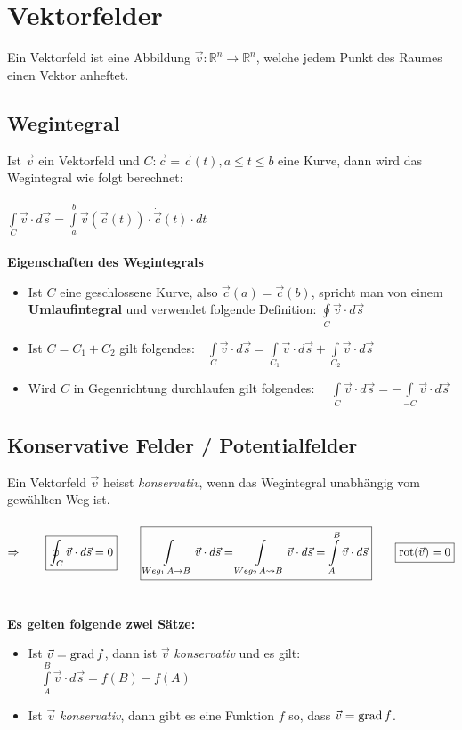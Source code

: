 \section{Vektorfelder}
Ein Vektorfeld ist eine Abbildung $\vec{v}:\mathbb{R}^n\rightarrow
\mathbb{R}^n$, welche jedem Punkt des Raumes einen Vektor anheftet.
\subsection{Wegintegral}
Ist $\vec{v}$ ein Vektorfeld und $C:\vec{c}=\vec{c}(t),a\leq t \leq b$ eine
Kurve, dann wird das Wegintegral wie folgt berechnet:\\\\
$\boxed{\int\limits_C\vec{v}\cdot d\vec{s}=
\int\limits_a^b\vec{v}(\vec{c}(t))\cdot \dot{\vec{c}}(t)\cdot dt}$\\\\

\textbf{Eigenschaften des Wegintegrals}
\begin{itemize}
  \item Ist $C$ eine geschlossene Kurve, also $\vec{c}(a)=\vec{c}(b)$, spricht
  man von einem \textbf{Umlaufintegral} und verwendet folgende Definition:
  $\oint\limits_C \vec{v}\cdot d\vec{s}$
  \item Ist $C=C_1+C_2$ gilt folgendes:$\quad\int\limits_C \vec{v}\cdot
  d\vec{s}=\int\limits_{C_1} \vec{v}\cdot d\vec{s}+\int\limits_{C_2}
  \vec{v}\cdot d\vec{s}$
  \item Wird $C$ in Gegenrichtung durchlaufen gilt folgendes:
  $\quad\int\limits_C \vec{v}\cdot
  d\vec{s}=-\int\limits_{-C} \vec{v}\cdot d\vec{s}$
\end{itemize}

\subsection{Konservative Felder / Potentialfelder}
Ein Vektorfeld $\vec{v}$ heisst \textit{konservativ}, wenn das Wegintegral
unabhängig vom gewählten Weg ist.\\\\
$\Rightarrow\qquad \boxed{\oint_C \vec{v}\cdot d\vec{s}=0}\qquad\boxed{
\int\limits_{Weg_1\, A\rightarrow B} \vec{v}\cdot d\vec{s}=\int\limits_{Weg_2\,
A\leadsto B} \vec{v}\cdot d\vec{s}=\int\limits_A^B \vec{v}\cdot
d\vec{s}}\qquad\boxed{\operatorname{rot} (\vec{v})=0}$\\\\\\	
\textbf{Es gelten folgende zwei Sätze:}
\begin{itemize}
  \item Ist $\vec{v}=\operatorname{grad} f$, dann ist $\vec{v}$
  \textit{konservativ} und es gilt: $\quad\int\limits_A^B \vec{v}\cdot d\vec{s}=f(B)-f(A)$
  \item Ist $\vec{v}$ \textit{konservativ}, dann gibt es eine Funktion $f$ so,
  dass $\vec{v}=\operatorname{grad} f$.
\end{itemize}

